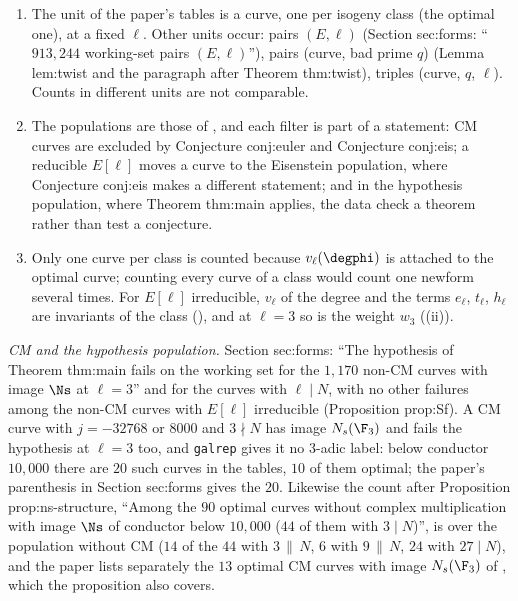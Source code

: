 \begin{sloppypar}
\begin{definition}\label{def:computation:units}
\begin{enumerate}[label=(\roman*)]
\item The unit of the paper's tables is a curve, one per isogeny class (the optimal one), at a fixed $\ell$. Other units occur: pairs $(E,\ell)$
(Section sec:forms: ``$913{,}244$ working-set pairs $(E,\ell)$''), pairs (curve, bad prime $q$) (Lemma lem:twist and the paragraph after Theorem thm:twist),
triples (curve, $q$, $\ell$). Counts in different units are not comparable.
\item The populations are those of , and each filter is part of a statement: CM curves are excluded by
Conjecture conj:euler and Conjecture conj:eis; a reducible $E[\ell]$ moves a curve to the Eisenstein population, where Conjecture conj:eis makes a
different statement; and in the hypothesis population, where Theorem thm:main applies, the data check a theorem rather than test a conjecture.
\item Only one curve per class is counted because $v_\ell(\degphi)$ is attached to the optimal curve; counting every curve of a class would count
one newform several times. For $E[\ell]$ irreducible, $v_\ell$ of the degree and the terms $e_\ell$, $t_\ell$, $h_\ell$ are invariants of the class
(), and at $\ell=3$ so is the weight $w_3$ ((ii)).
\end{enumerate}
\end{definition}

\emph{CM and the hypothesis population.} Section sec:forms: ``The hypothesis of Theorem thm:main fails on the working set for the $1{,}170$ non-CM
curves with image $\Ns$ at $\ell=3$'' and for the curves with $\ell\mid N$, with no other failures among the non-CM curves with $E[\ell]$ irreducible
(Proposition prop:Sf). A CM curve with $j=-32768$ or $8000$ and $3\nmid N$ has image $N_s(\F_3)$ and fails the hypothesis at $\ell=3$ too, and
\texttt{galrep} gives it no $3$-adic label: below conductor $10{,}000$ there are $20$ such curves in the tables, $10$ of them optimal; the paper's
parenthesis in Section sec:forms gives the $20$. Likewise the count after Proposition prop:ns-structure, ``Among the $90$ optimal curves without complex
multiplication with image $\Ns$ of conductor below $10{,}000$ ($44$ of them with $3\mid N$)'', is over the population without CM ($14$ of the $44$ with
$3\,\|\,N$, $6$ with $9\,\|\,N$, $24$ with $27\mid N$), and the paper lists separately the $13$ optimal CM curves with image $N_s(\F_3)$ of
, which the proposition also covers.


\end{sloppypar}
